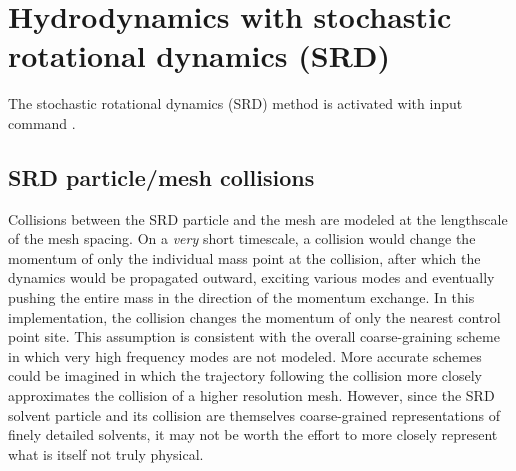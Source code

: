
\section{ Hydrodynamics with stochastic rotational dynamics (SRD) } \label{sec:srd}

The stochastic rotational dynamics (SRD) method is activated with input command .


\subsection{SRD particle/mesh collisions}

Collisions between the SRD particle and the mesh are modeled at the lengthscale of the mesh spacing.
On a {\it very} short timescale, a collision would change the momentum of only the individual mass point at the collision, after which the dynamics would be propagated outward, exciting various modes and eventually pushing the entire mass in the direction of the momentum exchange.
In this implementation, the collision changes the momentum of only the nearest control point site.
This assumption is consistent with the overall coarse-graining scheme in which very high frequency modes are not modeled.
More accurate schemes could be imagined in which the trajectory following the collision more closely approximates the collision of a higher resolution mesh. 
However, since the SRD solvent particle and its collision are themselves coarse-grained representations of finely detailed solvents, it may not be worth the effort to more closely represent what is itself not truly physical.

